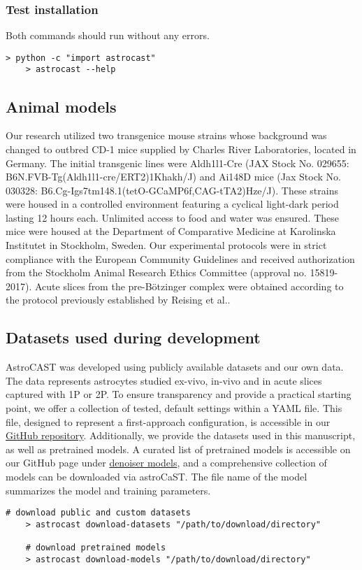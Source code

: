 \subsubsection{Test installation}

Both commands should run without any errors.

\begin{lstlisting}[style=bashStyle]
    > python -c "import astrocast"
    > astrocast --help
\end{lstlisting}

\subsection{Animal models}
Our research utilized two transgenice mouse strains whose background was changed to outbred CD-1 mice supplied by Charles River Laboratories, located in Germany. The initial transgenic lines were Aldh1l1-Cre (JAX Stock No. 029655: B6N.FVB-Tg(Aldh1l1-cre/ERT2)1Khakh/J) and Ai148D mice (Jax Stock No. 030328: B6.Cg-Igs7tm148.1(tetO-GCaMP6f,CAG-tTA2)Hze/J). These strains were housed in a controlled environment featuring a cyclical light-dark period lasting 12 hours each. Unlimited access to food and water was ensured. These mice were housed at the Department of Comparative Medicine at Karolinska Institutet in Stockholm, Sweden. Our experimental protocols were in strict compliance with the European Community Guidelines and received authorization from the Stockholm Animal Research Ethics Committee (approval no. 15819-2017). Acute slices from the pre-Bötzinger complex were obtained according to the protocol previously established by Reising et al.\citep{reising_prostaglandin_2022}.

\subsection{Datasets used during development}
\label{ref:dataset-availability}

AstroCAST was developed using publicly available datasets and our own data. The data represents astrocytes studied ex-vivo, in-vivo and in acute slices captured with \ac{1P} or \ac{2P}. To ensure transparency and provide a practical starting point, we offer a collection of tested, default settings within a YAML file. This file, designed to represent a first-approach configuration, is accessible in our \href{https://github.com/janreising/astroCAST}{GitHub repository}. Additionally, we provide the datasets used in this manuscript, as well as pretrained models. A curated list of pretrained models is accessible on our GitHub page under \href{https://github.com/janreising/astroCAST/tree/main/denoiser_models}{denoiser models}, and a comprehensive collection of models can be downloaded via astroCaST. The file name of the model summarizes the model and training parameters.

\begin{lstlisting}[style=bashStyle]
    # download public and custom datasets
    > astrocast download-datasets "/path/to/download/directory"

    # download pretrained models
    > astrocast download-models "/path/to/download/directory"
\end{lstlisting}